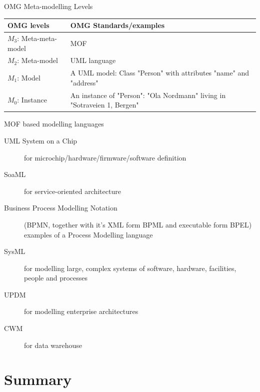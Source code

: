 \documentclass[slidetop,mathserif,red]{beamer}
\begin{document}
\begin{frame}{OMG Meta-modelling Levels}
    \begin{center}
  \begin{tabular}{|l|p{60mm}|}
    \hline
    \textbf{OMG levels} & \textbf{OMG Standards/examples}\\ \hline
    $M_3$: Meta-meta-model & MOF\\ \hline
    $M_2$: Meta-model & UML language\\ \hline
    $M_1$: Model & A UML model: Class "Person" with attributes "name" and "address"\\ \hline
    $M_0$: Instance & An instance of "Person": "Ola Nordmann" living in "Sotraveien 1, Bergen"\\ \hline
  \end{tabular}
    \end{center}
\end{frame}



\begin{frame}{MOF based modelling languages}
        \begin{description}
        \item [UML System on a Chip]  for microchip/hardware/firmware/software definition

        \item [SoaML] for service-oriented architecture
         
        \item [Business Process Modelling Notation]  (BPMN, together with it's XML form BPML and executable form BPEL) examples of a Process Modelling language
        
         \item [SysML] for modelling large, complex systems of software, hardware, facilities, people and processes

        \item [UPDM] for modelling enterprise architectures

        \item [CWM] for data warehouse
        \end{description}
\end{frame}







\section{Summary}
\end{document}
